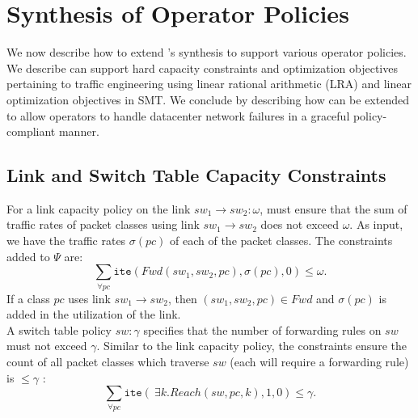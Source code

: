 \section{Synthesis of Operator Policies}
\label{sec:optimization}

We now describe how to extend \Name's synthesis to support various
operator policies.  We describe \Name can support
hard capacity constraints and
optimization objectives pertaining to traffic engineering using
 linear rational arithmetic (LRA) and linear
optimization objectives in SMT. We conclude by describing how \Name can be
extended to allow operators to handle datacenter network failures in a
graceful policy-compliant manner.

\subsection{Link and Switch Table Capacity Constraints} \label{sec:linkcap}
For a link capacity policy on the link $sw_1 \rightarrow sw_2: \omega$, 
\name must ensure that the sum of traffic rates of packet
classes using link $sw_1 \rightarrow sw_2$
does not exceed $\omega$. 
As input, we have the traffic rates $\sigma(pc)$ of
each of the packet classes. The constraints added to $\Psi$ are:
\begin{equation}
 \sum_{\forall pc} \texttt{ite}(Fwd(sw_1,sw_2, pc), \sigma(pc), 0) \leq \omega .
\end{equation}
If a class $pc$ uses link $sw_1 \rightarrow sw_2$, then $(sw_1,sw_2, pc) \in Fwd$
and $\sigma(pc)$ is added in the utilization of the link. \\
\noindent A switch table policy $sw : \gamma$ specifies that the number of forwarding 
rules on $sw$ must not exceed $\gamma$. Similar to the link capacity policy,
the constraints ensure the count of all packet classes which traverse $sw$ (each 
will require a forwarding rule) is $\leq \gamma$ :
\begin{equation}
\sum_{\forall pc} \texttt{ite}(~\exists k. Reach(sw,pc,k), 1, 0)  \leq \gamma.
\end{equation}





